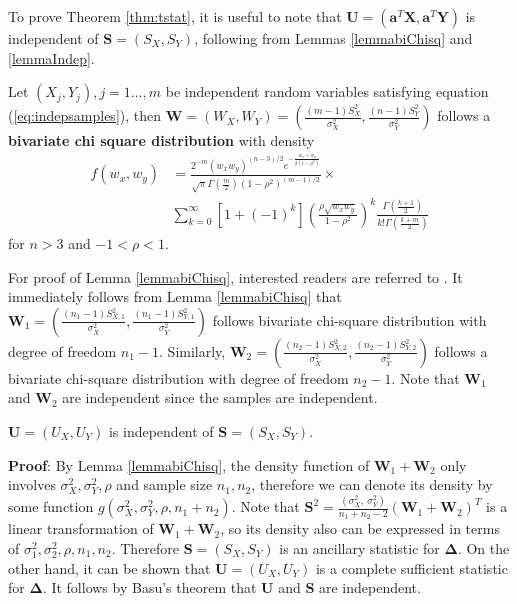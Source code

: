 	To prove Theorem \ref{thm:tstat}, it is useful to note that $\bm U = (\bm a^T\bm X, \bm a^T\bm 
	Y)$ is independent of $\bm S = (S_X, S_Y)$,
	following from Lemmas \ref{lemmabiChisq} and \ref{lemmaIndep}.
	\begin{lemma}\label{lemmabiChisq}
		Let $(X_{j}, Y_{j}), j=1 \ldots,  m$ be independent random variables satisfying equation 
		(\ref{eq:indepsamples}),
		then $\bm W = (W_{X},W_{Y}) =(\frac{(m -1)S_{X}^2}{\sigma_X^2}, 
		\frac{(n-1)S_{Y}^2}{\sigma_Y^2})$ 
		follows a \textbf{bivariate chi square distribution} with density 
		\begin{equation}\label{biChisq}
		\begin{aligned}
		f(w_x, w_y) & = \frac{2^{-m}(w_xw_y)^{(n-3)/2}e^{-\frac{w_x +
					w_y}{2(1-\rho^2)}}}{\sqrt{\pi}\Gamma(\frac{m}{2})(1-\rho^2)^{(m-1)/2}} 
		\times \\
		& \sum_{k=0}^{\infty}[1 +
		(-1)^k]\left(\frac{\rho\sqrt{w_xw_y}}{1-\rho^2}\right)^k\frac{\Gamma(\frac{k+1}{2})}{k!\Gamma(\frac{k+
				m}{2})}
		\end{aligned}
		\end{equation}
		for $n>3$ and $-1<\rho < 1$.
	\end{lemma}
	For proof of Lemma \ref{lemmabiChisq}, interested readers are referred to 
	\citet{joarder2009moments}.
	It immediately follows from Lemma \ref{lemmabiChisq} that $\bm W_1 = (\frac{(n_1 -1)S_{X, 
	1}^2}{\sigma_X^2}, \frac{(n_1-1)S_{Y, 1}^2}{\sigma_Y^2})$ follows bivariate chi-square 
	distribution with degree of freedom $n_1-1$. Similarly, $\bm W_2 =(\frac{(n_2 -1)S_{X, 
	2}^2}{\sigma_X^2}, \frac{(n_2-1)S_{Y, 2}^2}{\sigma_Y^2})$ follows a bivariate chi-square 
	distribution with degree of freedom $n_2-1$.  Note that $\bm W_1$ and $\bm W_2$ are independent 
	since the samples are independent. 
	
	\begin{lemma}\label{lemmaIndep}
		$\bm U =(U_X, U_Y)$ is independent of $\bm S = (S_X ,S_Y)$.
	\end{lemma}
	\textbf{Proof}: By Lemma \ref{lemmabiChisq}, the density function of $
	\bm W_1 + \bm W_2$ only involves $\sigma^2_X, \sigma^2_Y, \rho$ and sample size $n_1, n_2$, 
	therefore
	we can denote its density by some function $g(\sigma^2_X, \sigma^2_Y, \rho,
	n_1 + n_2)$. Note that $\bm S^2 = \frac{(\sigma_X^2, ~\sigma^2_Y)}{n_1 +n_2 -2}(\bm W_1 + \bm 
	W_2)^T $
	is a linear transformation of $\bm W_1 + \bm W_2$, so its density also can be expressed in 
	terms of $\sigma^2_1, \sigma^2_2, \rho, n_1, n_2$. Therefore $\bm S = (S_X ,S_Y)$ is an 
	ancillary statistic for $\bm \Delta$. On the other hand, it can
	be shown that $\bm U =(U_X, U_Y)$ is a complete sufficient statistic for $\bm \Delta$. It 
	follows by
	Basu's theorem that $\bm U$ and $\bm S$ are independent. 
	
